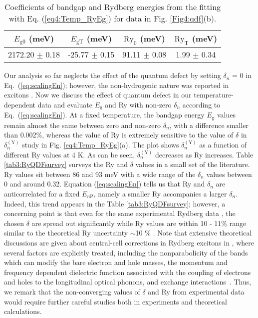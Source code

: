 \documentclass[aps,reprint,amsmath,amssymb,prb]{revtex4-1}
\begin{document}
\begin{table}[h]
  \caption{Coefficients of bandgap and Rydberg energies from the fitting with Eq. (\ref{eq4:Temp_RyEg}) for data in Fig. \ref{Fig4:qdf}(b).}
    \label{tab4:EgRyCotFitRes_QDF}
        \begin{ruledtabular}
 
    \begin{tabular}{c c c c} 
        $E_{\text{g0}}$ (meV) & $E_{\text{gT}}$ (meV) & $\text{Ry}_{\text{0}}$ (meV) & $\text{Ry}_{\text{T}}$ (meV) \\ 
        \hline
     
        2172.20  $\pm$ 0.18 & -25.77 $\pm$ 0.15 & 91.11 $\pm$ 0.08 & 1.99 $\pm$ 0.34\\  
       
    \end{tabular}
    \end{ruledtabular}
 \end{table}

Our analysis so far neglects the effect of the quantum defect by setting $\delta_n$ = 0 in Eq.~(\ref{eq:scalingEn}); however, the non-hydrogenic nature was reported in  excitons \cite{Schone2016}. Now we discuss the effect of quantum defect in our temperature-dependent data and evaluate $E_\text{g}$ and Ry with non-zero $\delta_n$ according to Eq.~(\ref{eq:scalingEn}). At a fixed temperature, the bandgap energy $E_\text{g}$ values remain almost the same between zero and non-zero $\delta_n$, with a difference smaller than 0.002\%, whereas the value of Ry is extremely sensitive to the value of $\delta$ in $\delta_n^{(\text{Y})}$ study in Fig. \ref{eq4:Temp_RyEg}(a). The plot shows $\delta_n^{(\text{Y})}$ as a function of different Ry values at 4 K. As can be seen, $\delta_n^{(\text{Y})}$ decreases as Ry increases. Table \ref{tab3:RyQDFsurvey} surveys the Ry and $\delta$ values in a small set of the literature. 
Ry values sit between 86 and 93 meV with a wide range of the $\delta_n$ values between 0 and around 0.32. Equation (\ref{eq:scalingEn}) tells us that Ry and $\delta_n$ are anticorrelated for a fixed $E_{n\text{P}}$, namely a smaller Ry accompanies a larger $\delta_n$. Indeed, this trend appears in the Table \ref{tab3:RyQDFsurvey}; however, a concerning point is that even for the same experimental Rydberg data \cite{Kazimierczuk2014}, the chosen $\delta$ are spread out significantly while Ry values are within 10 - 11\% range similar to the theoretical Ry uncertainty $\sim$10 $\%$ \cite{Kazimierczuk2014,Ziemkiewicz2020,Schone2016}. Note that extensive theoretical discussions are given about central-cell corrections in Rydberg excitons in {}, where several factors are explicitly treated, including the nonparabolicity of the bands which can modify the bare electron and hole masses, the momentum and frequency dependent dielectric function associated with the coupling of electrons and holes to the longitudinal optical phonons, and exchange interactions~\cite{Kavoulakis1997, Schone2016QD, Schone2016, Uihlein1981}. Thus, we remark that the non-converging values of $\delta$ and Ry from experimental data would require further careful studies both in experiments and theoretical calculations.
\end{document}
